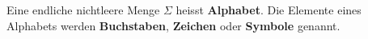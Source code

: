 %
%
Eine endliche nichtleere Menge \(\Sigma\) heisst \textbf{Alphabet}. Die Elemente eines Alphabets werden \textbf{Buchstaben}, \textbf{Zeichen} oder \textbf{Symbole} genannt.
